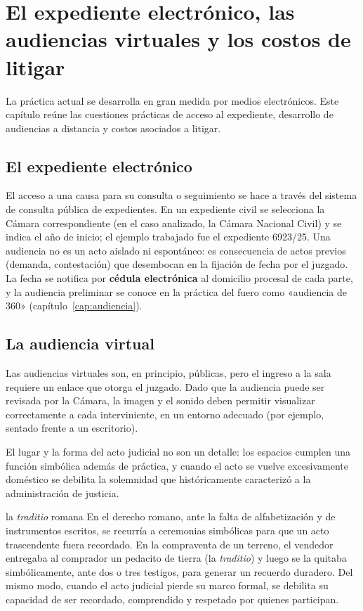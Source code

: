 \documentclass[12pt,oneside]{book}
\begin{document}
\chapter{El expediente electrónico, las audiencias virtuales y los costos de litigar}

La práctica actual se desarrolla en gran medida por medios electrónicos. Este capítulo reúne las cuestiones prácticas de acceso al expediente, desarrollo de audiencias a distancia y costos asociados a litigar.

\section{El expediente electrónico}

El acceso a una causa para su consulta o seguimiento se hace a través del sistema de consulta pública de expedientes. En un expediente civil se selecciona la Cámara correspondiente (en el caso analizado, la Cámara Nacional Civil) y se indica el año de inicio; el ejemplo trabajado fue el expediente 6923/25. Una audiencia no es un acto aislado ni espontáneo: es consecuencia de actos previos (demanda, contestación) que desembocan en la fijación de fecha por el juzgado. La fecha se notifica por \textbf{cédula electrónica} al domicilio procesal de cada parte, y la audiencia preliminar se conoce en la práctica del fuero como «audiencia de 360» (capítulo~\ref{cap:audiencia}).

\section{La audiencia virtual}

Las audiencias virtuales son, en principio, públicas, pero el ingreso a la sala requiere un enlace que otorga el juzgado. Dado que la audiencia puede ser revisada por la Cámara, la imagen y el sonido deben permitir visualizar correctamente a cada interviniente, en un entorno adecuado (por ejemplo, sentado frente a un escritorio).

El lugar y la forma del acto judicial no son un detalle: los espacios cumplen una función simbólica además de práctica, y cuando el acto se vuelve excesivamente doméstico se debilita la solemnidad que históricamente caracterizó a la administración de justicia.

\begin{ejemplo}{la \emph{traditio} romana}
En el derecho romano, ante la falta de alfabetización y de instrumentos escritos, se recurría a ceremonias simbólicas para que un acto trascendente fuera recordado. En la compraventa de un terreno, el vendedor entregaba al comprador un pedacito de tierra (la \emph{traditio}) y luego se la quitaba simbólicamente, ante dos o tres testigos, para generar un recuerdo duradero. Del mismo modo, cuando el acto judicial pierde su marco formal, se debilita su capacidad de ser recordado, comprendido y respetado por quienes participan.
\end{ejemplo}
\end{document}
